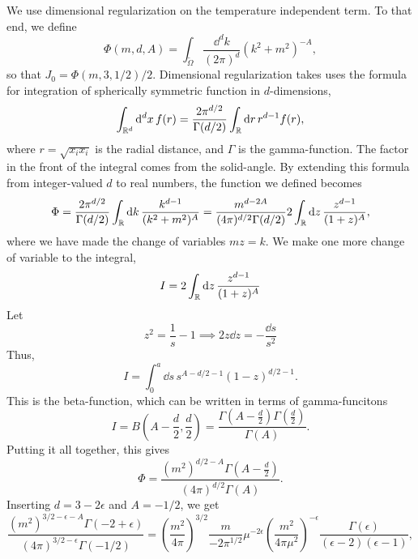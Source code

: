 We use dimensional regularization on the temperature independent term. 
To that end, we define
\begin{equation}
    \Phi(m, d, A) = \int_{\tilde \Omega} \frac{\dd^d k}{(2 \pi)^d} (k^2 + m^2)^{-A},
\end{equation}
so that $J_0 = \Phi(m, 3, 1/2) / 2$.
Dimensional regularization takes uses the formula for integration of spherically symmetric function in $d$-dimensions,
\begin{equation}
    \int_{\mathbb{R}^d} \dd^d x \, f(r) 
    = \frac{2 \pi^{d/2}}{\Gamma(d/2)} \int_{\mathbb{R}} \dd r \, r^{d-1}f(r),
\end{equation}
where $r = \sqrt{x_i x_i}$ is the radial distance, and $\Gamma$ is the gamma-function.
The factor in the front of the integral comes from the solid-angle.
By extending this formula from integer-valued $d$ to real numbers, the function we defined becomes
\begin{equation}
    \Phi 
    = \frac{2 \pi^{d/2}}{\Gamma(d/2)} \int_{\mathbb{R}} \dd k \, 
    \frac{k^{d-1}}{(k^2 + m^2)^A}
    = \frac{m^{d - 2A}}{(4 \pi)^{d / 2}\Gamma(d/2)} 
    2 \int_{\mathbb{R}} \dd z \, \frac{z^{d - 1}}{(1 + z)^A}, 
\end{equation}
where we have made the change of variables $m z = k$.
We make one more change of variable to the integral,
\begin{equation}
    I = 2 \int_{\mathbb{R}} \dd z \, \frac{z^{d - 1}}{(1 + z)^A}
\end{equation}
Let
\begin{equation}
    z^2 = \frac{1}{s} - 1 \implies 2 z \dd z = - \frac{\dd s}{s^2}
\end{equation}
Thus,
\begin{equation}
    I = \int_0^a \dd s \, s^{A - d/2 - 1} (1 - z)^{d/2 - 1}.
\end{equation}
This is the beta-function, which can be written in terms of gamma-funcitons~\cite{Peskin:IntroQFT}
\begin{equation}
    I = B\left(A - \frac{d}{2}, \frac{d}{2}\right) 
    = \frac{\Gamma\left(A - \frac{d}{2}\right) \Gamma\left(\frac{d}{2}\right)}{\Gamma(A)}.
\end{equation}
Putting it all together, this gives
\begin{equation}
    \Phi = 
    \frac{
        (m^2)^{d/2 - A} \Gamma \left(A - \frac{d}{2} \right) 
    }
    {
        (4 \pi)^{d / 2}\Gamma(A)
    }.
\end{equation}
Inserting $d = 3 - 2\epsilon$ and $A = -1/2$, we get
\begin{equation}
    \frac{
        (m^2)^{3/2 - \epsilon - A} \Gamma \left(-2 + \epsilon \right) 
    }
    {
        (4 \pi)^{3/2 - \epsilon}\Gamma(-1/2)
    }
    = 
    \left(\frac{m^2}{4 \pi}\right)^{3/2} 
    \frac{m}{- 2 \pi^{1/2}}
    \mu^{-2\epsilon}
    \left(\frac{m^2}{4 \pi \mu^2}\right)^{- \epsilon}
    \frac{\Gamma(\epsilon)}{(\epsilon - 2)(\epsilon - 1)},
\end{equation}
